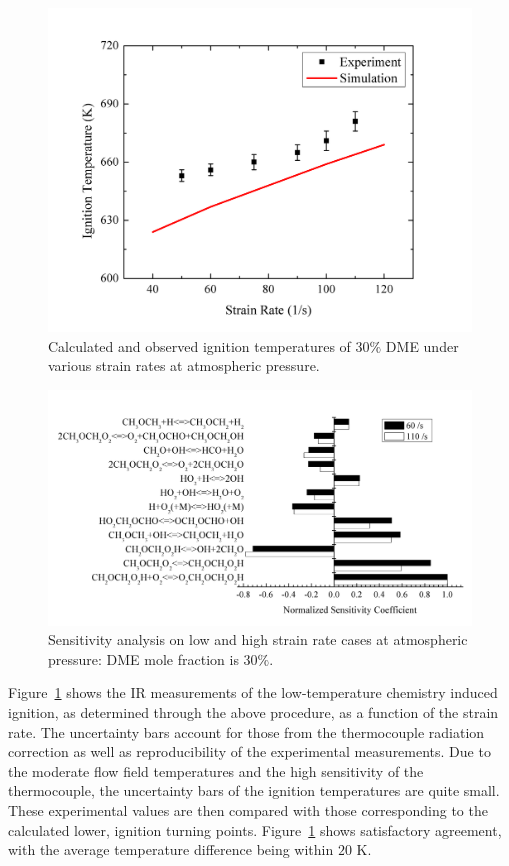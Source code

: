 \begin{figure}[t]
  \centering
  \scriptsize
  \includegraphics[width=1.0\textwidth]{ch-NTC/Ign-SR.png}
  \normalsize
  \caption{Calculated and observed ignition temperatures of $30\%$ DME under various strain rates at atmospheric pressure.}
  \label{fig:Ign-SR}
\end{figure} 

\begin{figure}[t]
  \centering
  \scriptsize
  \includegraphics[width=1.0\textwidth]{ch-NTC/Sen_SR.png}
  \normalsize
  \caption{Sensitivity analysis on low and high strain rate cases at atmospheric pressure: DME mole fraction is $30\%$.}
  \label{fig:Sen_SR}
\end{figure}

Figure~\ref{fig:Ign-SR} shows the IR measurements of the low-temperature chemistry induced ignition, as determined through the above procedure, as a function of the strain rate.  The uncertainty bars account for those from the thermocouple radiation correction as well as reproducibility of the experimental measurements.  Due to the moderate flow field temperatures and the high sensitivity of the thermocouple, the uncertainty bars of the ignition temperatures are quite small.  These experimental values are then compared with those corresponding to the calculated lower, ignition turning points.  Figure~\ref{fig:Ign-SR} shows satisfactory agreement, with the average temperature difference being within $20$ K.

